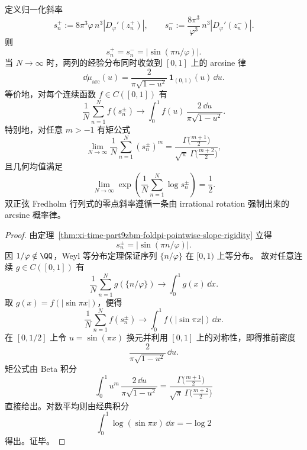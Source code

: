\begin{corollary}\label{cor:xi-time-part9zbm-foldpi-arcsine-slope-law}
定义归一化斜率
\[
s_n^+ := 8\pi^3\varphi\,n^3 |D_\varphi'(z_n^+)|,
\qquad
s_n^-:= \frac{8\pi^3}{\varphi^3}\,n^3 |D_\varphi'(z_n^-)|.
\]
则
\[
s_n^+=s_n^-= |\sin(\pi n/\varphi)|.
\]
当 \(N\to\infty\) 时，两列的经验分布同时收敛到 \([0,1]\) 上的 arcsine 律
\[
\dd\mu_{\mathrm{arc}}(u)
=
\frac{2}{\pi\sqrt{1-u^2}}\,\mathbf{1}_{(0,1)}(u)\,\dd u.
\]
等价地，对每个连续函数 \(f\in C([0,1])\) 有
\[
\frac{1}{N}\sum_{n=1}^N f(s_n^\pm)
\longrightarrow
\int_0^1 f(u)\,\frac{2\,\dd u}{\pi\sqrt{1-u^2}}.
\]
特别地，对任意 \(m>-1\) 有矩公式
\[
\lim_{N\to\infty}\frac{1}{N}\sum_{n=1}^N (s_n^\pm)^m
=
\frac{\Gamma\!\bigl(\frac{m+1}{2}\bigr)}
{\sqrt\pi\,\Gamma\!\bigl(\frac{m+2}{2}\bigr)},
\]
且几何均值满足
\[
\lim_{N\to\infty}\exp\!\left(\frac{1}{N}\sum_{n=1}^N \log s_n^\pm\right)
=
\frac{1}{2}.
\]
双正弦 Fredholm 行列式的零点斜率遵循一条由 irrational rotation 强制出来的 arcsine 概率律。
\end{corollary}
\begin{proof}
由定理~\ref{thm:xi-time-part9zbm-foldpi-pointwise-slope-rigidity} 立得
\[
s_n^\pm = |\sin(\pi n/\varphi)|.
\]
因 \(1/\varphi\notin\QQ\)，Weyl 等分布定理保证序列 \(\{n/\varphi\}\) 在 \([0,1)\) 上等分布。
故对任意连续 \(g\in C([0,1])\) 有
\[
\frac{1}{N}\sum_{n=1}^N g(\{n/\varphi\}) \to \int_0^1 g(x)\,\dd x.
\]
取 \(g(x)=f(|\sin\pi x|)\)，便得
\[
\frac{1}{N}\sum_{n=1}^N f(s_n^\pm) \to \int_0^1 f(|\sin\pi x|)\,\dd x.
\]
在 \([0,1/2]\) 上令 \(u=\sin(\pi x)\) 换元并利用 \([0,1]\) 上的对称性，即得推前密度
\[
\frac{2}{\pi\sqrt{1-u^2}}\,\dd u.
\]
矩公式由 Beta 积分
\[
\int_0^1 u^m\,\frac{2\,\dd u}{\pi\sqrt{1-u^2}}
=
\frac{\Gamma\bigl(\frac{m+1}{2}\bigr)}
{\sqrt\pi\,\Gamma\bigl(\frac{m+2}{2}\bigr)}
\]
直接给出。对数平均则由经典积分
\[
\int_0^1 \log(\sin\pi x)\,\dd x=-\log 2
\]
得出。证毕。
\end{proof}

